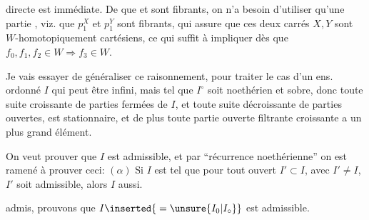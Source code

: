 directe est immédiate. De   que
et
sont fibrants, on n'a besoin d'utiliser qu'une partie , viz. que $p_1^X$ et $p_1^Y$ sont fibrants, qui assure que ces deux carrés $X,Y$ sont $W$-homotopiquement cartésiens, ce qui suffit à impliquer dès que $f_0,f_1,f_2\in W\Rightarrow f_3\in W$.

Je vais essayer de généraliser ce raisonnement, pour traiter le cas d'un ens. ordonné $I$ qui peut être infini, mais tel que $I^\circ$ soit noethérien et sobre, donc toute  suite croissante de parties fermées de $I$, et toute suite décroissante de parties ouvertes, est stationnaire, et de plus toute partie ouverte filtrante croissante a un plus grand élément.

On veut prouver que $I$ est admissible, et par ``récurrence noethérienne'' on est ramené à prouver ceci: $(\alpha)$ Si $I$ est
\margin{$\Big|$}
tel que pour tout ouvert $I'\subset I$, avec $I'\ne I$,  $I'$ soit admissible, alors $I$ aussi.

  \inserted{$(\alpha)$} admis, prouvons que $I\inserted{{}=\unsure{I_0|I_\circ}}$ est admissible.
